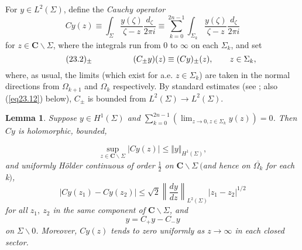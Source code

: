 \documentclass{surv-l}
\theoremstyle{plain}
\newtheorem{lemma}[theorem]{Lemma}
\theoremstyle{definition}
\numberwithin{equation}{chapter}
\begin{document}
For $y\in L^{2}(\Sigma)$, define the \emph{Cauchy operator}
\setcounter{equation}{0}
\begin{equation}\label{eq23.1}
Cy(z)\equiv\int_{\Sigma}\frac{y(\zeta)}{\zeta-z}\frac{d_{\zeta}}{2\pi i}\equiv\sum_{k=0}^{2n-1}\int_{\Sigma_{k}}\frac{y(\zeta)}{\zeta-z}\frac{d_{\zeta}}{2\pi i}
\end{equation}
for $z\in \textbf{C}\backslash \Sigma$, where the integrals run from $0$ to $\infty$ on each $\Sigma_{k}$, and set
\begin{equation*}
\tag*{$(23.2)_{\pm}$} \qquad \qquad \quad (C_{\pm}y)(z)\equiv(Cy)_{\pm}(z),\qquad z\in\Sigma_{k},
\end{equation*}
where, as usual, the limits (which exist for a.e. $z\in\Sigma_{k}$) are taken in the normal directions from $\Omega_{k+1}$ and $\Omega_{k}$ respectively. By standard estimates (see \cite{St}; also (\ref{eq23.12}) below), $C_{\pm}$ is bounded from $L^{2}(\Sigma)\rightarrow L^{2}(\Sigma)$.
\setcounter{theorem}{2}
\begin{lemma}\label{lem23.3}
Suppose $y\in H^{1}(\Sigma)$ and $\sum_{k=0}^{2n-1}(\lim_{z\rightarrow 0, z\in\Sigma_{k}}y(z))=0$. Then $Cy$ is holomorphic, bounded,

\setcounter{equation}{3}
\begin{equation}\label{eq23.4}
\sup_{z\in \mathbf{C}\backslash \Sigma}|Cy(z)|\leq\Vert y\Vert_{H^{1}(\Sigma)},
\end{equation}
and uniformly H\"{o}lder continuous of order $ \frac{1}{2}$ on $\mathbf{C}\backslash \Sigma\ ($and hence on $\overline{\Omega_{k}}$ for each k$)$,
\renewcommand\theequation{23.5}
\setcounter{equation}{4}
\begin{equation}\label{eq23.5}
|Cy(z_{1})-Cy(z_{2})|\leq\sqrt{2}\left\|\frac{dy}{dz}\right\|_{L^{2}(\Sigma)}|z_{1}-z_{2}|^{1/2}
\end{equation}
for all $z_{1},\ z_{2}$ in the same component of $\mathbf{C}\backslash \Sigma$, and
\renewcommand\theequation{23.6}
\setcounter{equation}{5}
\begin{equation}\label{eq23.6}
y=C_{+}y-C_{-}y
\end{equation}
on $\Sigma\backslash 0$. Moreover, $Cy(z)$ tends to zero uniformly as $z\rightarrow\infty$ in each closed sector.
\end{lemma}
\end{document}
